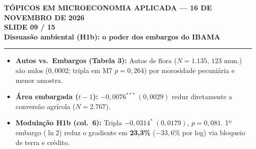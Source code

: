 \documentclass[11pt,a4paper]{article}
\newcommand{\slidenum}{1}
\begin{document}
\newpage

\renewcommand{\slidenum}{9}
\noindent
\begin{minipage}{\textwidth}
\begin{center}
{\color{cinza}\footnotesize\textbf{TÓPICOS EM MICROECONOMIA APLICADA --- 16 DE NOVEMBRO DE 2026}\\[1.2mm]}
{\color{cinza}\bfseries\Large SLIDE 09 / 15\\[1.5mm]}
{\color{verde}\bfseries\LARGE Dissuasão ambiental (H1b): o poder dos embargos do IBAMA\\[2.5mm]}
\rule{\textwidth}{1pt}
\end{center}
\end{minipage}
\vspace{1.5mm}

\begin{tcolorbox}[title={\bfseries\small ÂNCORAS EMPÍRICAS E CONCEITUAIS DO SLIDE}]
\begin{itemize}[leftmargin=*,itemsep=1mm,topsep=0.5mm]
    \item \textbf{Autos vs.\ Embargos (Tabela 3):} Autos de flora ($N=1.135$, $123$ mun.) são nulos ($0{,}0002$; tripla em M7 $p=0{,}264$) por morosidade pecuniária e menor amostra.
    \item \textbf{Área embargada ($t-1$):} $-0{,}0076^{***}\;(0{,}0029)$ reduz diretamente a conversão agrícola ($N=2.767$).
    \item \textbf{Modulação H1b (col.\ 6):} Tripla $-0{,}0314^{*}\;(0{,}0179)$, $p=0{,}081$. 1º embargo ($\ln 2$) reduz o gradiente em \textbf{23,3\%} ($-33{,}6\%$ por log) via bloqueio de terra e crédito.
\end{itemize}
\end{tcolorbox}
\vspace{2mm}
\end{document}
